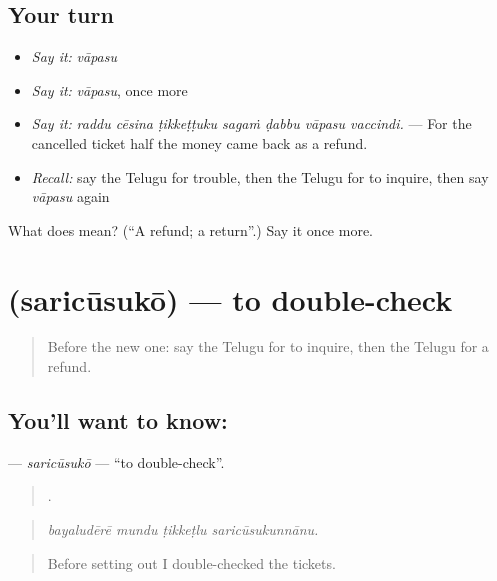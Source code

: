\subsection*{Your turn}
\begin{itemize}
\raggedright
  \item \emph{Say it:} \emph{vāpasu}
  \item \emph{Say it:} \emph{vāpasu}, once more
  \item \emph{Say it:} \emph{raddu cēsina ṭikkeṭṭuku sagaṁ ḍabbu vāpasu vaccindi.} — For the cancelled ticket half the money came back as a refund.
  \item \emph{Recall:} say the Telugu for trouble, then the Telugu for to inquire, then say \emph{vāpasu} again
\end{itemize}

\begin{tcolorbox}[breakable,colback=teal!4,colframe=teal!35!black,title={Before you move on}]
What does  mean? (\textquotedblleft{}A refund; a return\textquotedblright{}.) Say it once more.
\end{tcolorbox}
\section[\texorpdfstring{\te{సరిచూసుకో} (saricūsukō)}{సరిచూసుకో (saricūsukō)}]{ (saricūsukō) — to double-check}

\label{lesson:TE-C460-saricusuko}



\begin{quote}
Before the new one: say the Telugu for to inquire, then the Telugu for a refund.
\end{quote}

\subsection*{You'll want to know: }
\textbf{} — \emph{saricūsukō} — \textquotedblleft{}to double-check\textquotedblright{}.

\begin{quote}
   .
\end{quote}

\begin{quote}
\emph{bayaludērē mundu ṭikkeṭlu saricūsukunnānu.}
\end{quote}

\begin{quote}
Before setting out I double-checked the tickets.
\end{quote}

